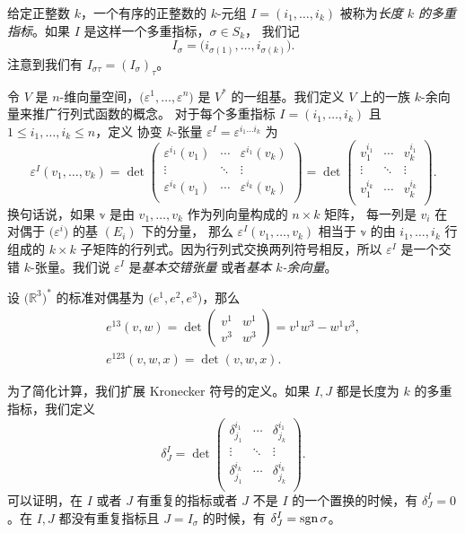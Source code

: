 给定正整数 $k$，一个有序的正整数的 $k$-元组 $I=(i_1,\dots,i_k)$
被称为\emph{长度 $k$ 的多重指标}。如果 $I$ 是这样一个多重指标，$\sigma\in S_k$，
我们记
\[
  I_\sigma=\bigl(i_{\sigma(1)},\dots,i_{\sigma(k)}\bigr).  
\]
注意到我们有 $I_{\sigma\tau}=(I_\sigma)_\tau$。

令 $V$ 是 $n$-维向量空间，$\bigl(\varepsilon^1,\dots,\varepsilon^n \bigr)$
是 $V^*$ 的一组基。我们定义 $V$ 上的一族 $k$-余向量来推广行列式函数的概念。
对于每个多重指标 $I=(i_1,\dots,i_k)$ 且 $1\leq i_1,\dots,i_k\leq n$，定义
协变 $k$-张量 $\varepsilon^I=\varepsilon^{i_1\dots i_k}$ 为
\[
  \varepsilon^I(v_1,\dots,v_k)=\det \begin{pmatrix}
    \varepsilon^{i_1}(v_1) & \cdots & \varepsilon^{i_1}(v_k)\\
    \vdots & \ddots & \vdots \\
    \varepsilon^{i_k}(v_1) & \cdots & \varepsilon^{i_k}(v_k)\\
  \end{pmatrix}  =\det\begin{pmatrix}
    v_1^{i_1} & \cdots & v_k^{i_1} \\
    \vdots & \ddots & \vdots \\
    v_1^{i_k} & \cdots & v_k^{i_k} \\
  \end{pmatrix}.
\]
换句话说，如果 $\mathbb{v}$ 是由 $v_1,\dots,v_k$ 作为列向量构成的 $n\times k$ 矩阵，
每一列是 $v_i$ 在对偶于 $\bigl(\varepsilon^i\bigr)$ 的基 $(E_i)$ 下的分量，
那么 $\varepsilon^I(v_1,\dots,v_k)$ 相当于 $\mathbb{v}$ 的由 $i_1,\dots,i_k$ 行组成的
$k\times k$ 子矩阵的行列式。因为行列式交换两列符号相反，所以 $\varepsilon^I$
是一个交错 $k$-张量。我们说 $\varepsilon^I$ 是\emph{基本交错张量}
或者\emph{基本 $k$-余向量}。

\begin{example}
  设 $\bigl(\mathbb{R}^3\bigr)^*$ 的标准对偶基为 $\bigl(e^1,e^2,e^3\bigr)$，那么
  \begin{gather*}
    e^{13}(v,w)=\det
    \begin{pmatrix}
      v^1 & w^1 \\
      v^3 & w^3 
    \end{pmatrix}=v^1w^3-w^1v^3  ,\\
    e^{123}(v,w,x)=\det(v,w,x).
  \end{gather*}
\end{example}

为了简化计算，我们扩展 Kronecker 符号的定义。如果 $I,J$ 都是长度为 $k$
的多重指标，我们定义
\[
  \delta_J^I=\det\begin{pmatrix}
    \delta_{j_1}^{i_1} & \cdots & \delta_{j_k}^{i_1} \\
    \vdots & \ddots & \vdots \\
    \delta_{j_1}^{i_k} & \cdots & \delta_{j_k}^{i_k} \\
  \end{pmatrix}  .
\]
可以证明，在 $I$ 或者 $J$ 有重复的指标或者 $J$ 不是 $I$ 的一个置换的时候，有
$\delta_J^I=0$。在 $I,J$ 都没有重复指标且 $J=I_\sigma$ 的时候，有 $\delta_J^I=\operatorname{sgn}\sigma$。

